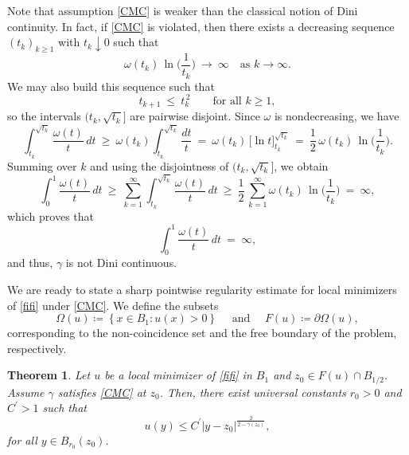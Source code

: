 \documentclass[reqno,11pt]{amsart}
\newtheorem{theorem}{Theorem}[section]
\newcommand{\1}{\mathds{1}}
\numberwithin{equation}{section}
\begin{document}
Note that assumption \eqref{CMC} is weaker than the classical notion of Dini continuity. In fact, if \eqref{CMC} is violated, then there exists a decreasing sequence $(t_k)_{k\ge 1}$ with $t_k\downarrow 0$ such that
$$
  \omega(t_k)\,\ln\!\Big(\frac{1}{t_k}\Big)\ \longrightarrow\ \infty \quad \text{as } k\to\infty.
$$
We may also build this sequence such that
$$
  t_{k+1}\ \le\ t_k^{\,2}\qquad\text{for all }k\ge 1,
$$
so the intervals $(t_k,\sqrt{t_k}]$ are pairwise disjoint. Since $\omega$ is nondecreasing, we have
$$
  \int_{t_k}^{\sqrt{t_k}} \frac{\omega(t)}{t}\,dt
  \ \ge\ \omega(t_k)\int_{t_k}^{\sqrt{t_k}} \frac{dt}{t}
  \ =\ \omega(t_k)\,\Big[\ln t\Big]_{t_k}^{\sqrt{t_k}}
  \ =\ \frac{1}{2}\,\omega(t_k)\,\ln\!\Big(\frac{1}{t_k}\Big).
$$
Summing over $k$ and using the disjointness of $(t_k,\sqrt{t_k}]$, we obtain
$$
  \int_{0}^{1} \frac{\omega(t)}{t}\,dt
  \ \ge\ \sum_{k=1}^{\infty} \int_{t_k}^{\sqrt{t_k}} \frac{\omega(t)}{t}\,dt
  \ \ge\ \frac{1}{2}\,\sum_{k=1}^{\infty} \omega(t_k)\,\ln\!\Big(\frac{1}{t_k}\Big)
  \ =\ \infty,
$$
which proves that
$$
  \int_{0}^{1} \frac{\omega(t)}{t}\,dt\ =\ \infty,
$$
and thus, $\gamma$ is not Dini continuous.

\medskip

We are ready to state a sharp pointwise regularity estimate for local minimizers of \eqref{fifi} under \eqref{CMC}. We define the subsets 
$$
	\Omega(u) \coloneqq  \left \{x\in B_{1} \colon u(x) > 0\right \} \quad \text{ and } \quad F(u) \coloneqq  \partial \Omega(u),
$$
corresponding to the non-coincidence set and the free boundary of the problem, respectively. 

\begin{theorem}\label{thm-beicodebode}
	Let $u$ be a local minimizer of \eqref{fifi} in $B_1$ and $z_0 \in F(u) \cap B_{1/2}$. Assume $\gamma$ satisfies \eqref{CMC} at $z_0$. 
Then, there exist universal constants $r_0>0$ and $C^\prime>1$ such that
\begin{equation}\label{thm}
		 u(y)\leq C^\prime \left |y-z_0 \right |^{\frac{2}{2-\gamma(z_0)}},
	\end{equation}
for all $y \in B_{r_0}(z_0)$.
\end{theorem}
\end{document}
